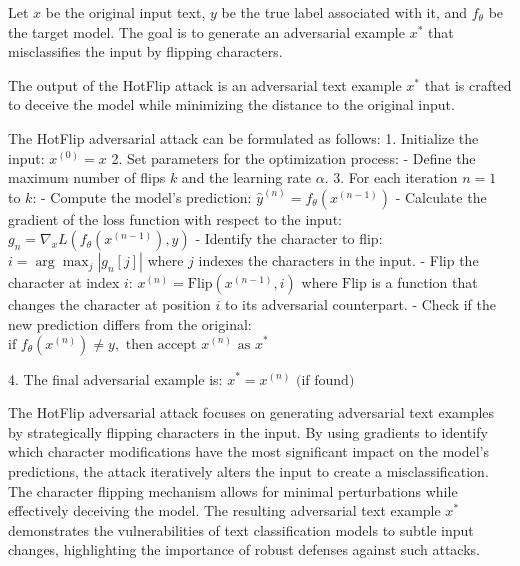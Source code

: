 Let $x$ be the original input text, $y$ be the true label associated with it, and $f_{\theta}$ be the target model. The goal is to generate an adversarial example $x^*$ that misclassifies the input by flipping characters.

The output of the HotFlip attack is an adversarial text example $x^*$ that is crafted to deceive the model while minimizing the distance to the original input.

The HotFlip adversarial attack can be formulated as follows:
1. Initialize the input:
   $x^{(0)} = x$
2. Set parameters for the optimization process:
   - Define the maximum number of flips $k$ and the learning rate $\alpha$.
3. For each iteration $n = 1$ to $k$:
   - Compute the model's prediction:
   $\hat{y}^{(n)} = f_{\theta}(x^{(n-1)})$
   - Calculate the gradient of the loss function with respect to the input:
   $g_n = \nabla_x L(f_{\theta}(x^{(n-1)}), y)$
   - Identify the character to flip:
   $i = \arg\max_{j} |g_n[j]|$
   where $j$ indexes the characters in the input.
   - Flip the character at index $i$:
   $x^{(n)} = \text{Flip}(x^{(n-1)}, i)$
   where $\text{Flip}$ is a function that changes the character at position $i$ to its adversarial counterpart.
   - Check if the new prediction differs from the original:
   $\text{if } f_{\theta}(x^{(n)}) \neq y, \text{ then accept } x^{(n)} \text{ as } x^*$

4. The final adversarial example is:
   $x^* = x^{(n)} \text{ (if found)}$

The HotFlip adversarial attack focuses on generating adversarial text examples by strategically flipping characters in the input. By using gradients to identify which character modifications have the most significant impact on the model's predictions, the attack iteratively alters the input to create a misclassification. The character flipping mechanism allows for minimal perturbations while effectively deceiving the model. The resulting adversarial text example $x^*$ demonstrates the vulnerabilities of text classification models to subtle input changes, highlighting the importance of robust defenses against such attacks.
